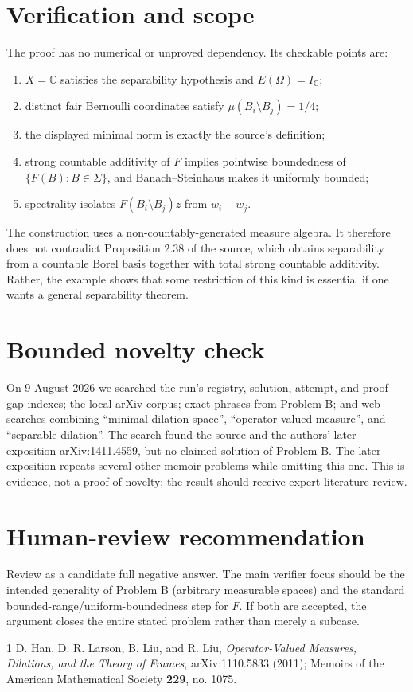 \documentclass[11pt]{article}
\newcommand{\C}{\mathbb C}
\newcommand{\1}{\mathbf 1}
\begin{document}
\section{Verification and scope}

The proof has no numerical or unproved dependency.  Its checkable points are:
\begin{enumerate}
\item $X=\C$ satisfies the separability hypothesis and $E(\Omega)=I_\C$;
\item distinct fair Bernoulli coordinates satisfy
      $\mu(B_i\setminus B_j)=1/4$;
\item the displayed minimal norm is exactly the source's definition;
\item strong countable additivity of $F$ implies pointwise boundedness of
      $\{F(B):B\in\Sigma\}$, and Banach--Steinhaus makes it uniformly bounded;
\item spectrality isolates $F(B_i\setminus B_j)z$ from $w_i-w_j$.
\end{enumerate}

The construction uses a non-countably-generated measure algebra.  It therefore
does not contradict Proposition 2.38 of the source, which obtains separability
from a countable Borel basis together with total strong countable additivity.
Rather, the example shows that some restriction of this kind is essential if
one wants a general separability theorem.

\section{Bounded novelty check}

On 9 August 2026 we searched the run's registry, solution, attempt, and
proof-gap indexes; the local arXiv corpus; exact phrases from Problem B; and
web searches combining ``minimal dilation space'', ``operator-valued
measure'', and ``separable dilation''.  The search found the source and the
authors' later exposition arXiv:1411.4559, but no claimed solution of Problem
B.  The later exposition repeats several other memoir problems while omitting
this one.  This is evidence, not a proof of novelty; the result should receive
expert literature review.

\section{Human-review recommendation}

Review as a candidate full negative answer.  The main verifier focus should be
the intended generality of Problem B (arbitrary measurable spaces) and the
standard bounded-range/uniform-boundedness step for $F$.  If both are accepted,
the argument closes the entire stated problem rather than merely a subcase.

\begin{thebibliography}{1}
D. Han, D. R. Larson, B. Liu, and R. Liu,
\emph{Operator-Valued Measures, Dilations, and the Theory of Frames},
arXiv:1110.5833 (2011); Memoirs of the American Mathematical Society
\textbf{229}, no. 1075.
\end{thebibliography}
\end{document}
